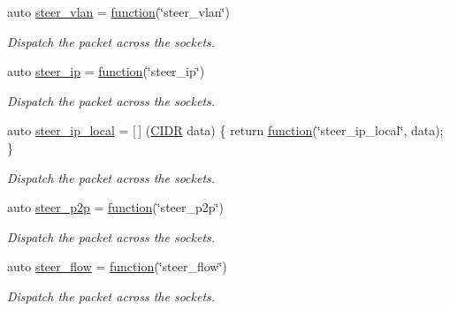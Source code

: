 \begin{DoxyCompactItemize}
auto \hyperlink{namespacepfq_1_1lang_1_1anonymous__namespace_02default_8hpp_03_a2c6a8ad5a3ae8b60a6a3d18a510f22ac}{steer\+\_\+vlan} = \hyperlink{namespacepfq_1_1lang_a1a4638059d700ae08d0ca63886ff2bb3}{function}(\char`\"{}steer\+\_\+vlan\char`\"{})
\begin{DoxyCompactList}\small\item\em Dispatch the packet across the sockets. \end{DoxyCompactList}\item 
auto \hyperlink{namespacepfq_1_1lang_1_1anonymous__namespace_02default_8hpp_03_afe1c69c555a75021f7e637086cb1264c}{steer\+\_\+ip} = \hyperlink{namespacepfq_1_1lang_a1a4638059d700ae08d0ca63886ff2bb3}{function}(\char`\"{}steer\+\_\+ip\char`\"{})
\begin{DoxyCompactList}\small\item\em Dispatch the packet across the sockets. \end{DoxyCompactList}\item 
auto \hyperlink{namespacepfq_1_1lang_1_1anonymous__namespace_02default_8hpp_03_a573c7621db324727daedc11fd27ab709}{steer\+\_\+ip\+\_\+local} = \mbox{[}$\,$\mbox{]} (\hyperlink{structpfq_1_1lang_1_1CIDR}{C\+I\+DR} data) \{ return \hyperlink{namespacepfq_1_1lang_a1a4638059d700ae08d0ca63886ff2bb3}{function}(\char`\"{}steer\+\_\+ip\+\_\+local\char`\"{}, data); \}
\begin{DoxyCompactList}\small\item\em Dispatch the packet across the sockets. \end{DoxyCompactList}\item 
auto \hyperlink{namespacepfq_1_1lang_1_1anonymous__namespace_02default_8hpp_03_a93e5f91a2b955269de017225cf62e711}{steer\+\_\+p2p} = \hyperlink{namespacepfq_1_1lang_a1a4638059d700ae08d0ca63886ff2bb3}{function}(\char`\"{}steer\+\_\+p2p\char`\"{})
\begin{DoxyCompactList}\small\item\em Dispatch the packet across the sockets. \end{DoxyCompactList}\item 
auto \hyperlink{namespacepfq_1_1lang_1_1anonymous__namespace_02default_8hpp_03_adeb44c976ac903e7b13addb65ac41f9f}{steer\+\_\+flow} = \hyperlink{namespacepfq_1_1lang_a1a4638059d700ae08d0ca63886ff2bb3}{function}(\char`\"{}steer\+\_\+flow\char`\"{})
\begin{DoxyCompactList}\small\item\em Dispatch the packet across the sockets. \end{DoxyCompactList}\item 

\end{DoxyCompactItemize}
